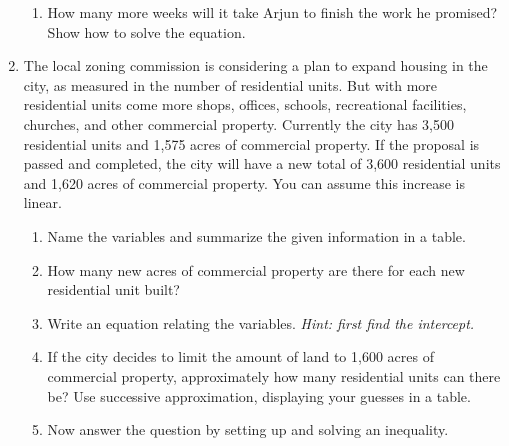 \begin{enumerate}
\begin{enumerate}
\item How many more weeks will it take Arjun to finish the work he promised?  Show how to solve the equation. 
\vfill
\vfill
\end{enumerate} 

\newpage

\item The local zoning commission is considering a plan to expand housing in the city, as measured in the number of residential units.  But with more residential units come more shops, offices, schools, recreational facilities, churches, and other commercial property. Currently the city has 3,500 residential units and 1,575 acres of commercial property.  If the proposal is passed and completed, the city will have a new total of 3,600 residential units and 1,620 acres of commercial property.  You can assume this increase is linear.
\begin{enumerate}
\item Name the variables and summarize the given information in a table. 
\vfill
\item How many new acres of commercial property are there for each new residential unit built? 
\vfill
\item Write an equation relating the variables. \emph{Hint:  first find the intercept.}
\vfill
\vfill
\item If the city decides to limit the amount of land to 1,600 acres of commercial property, approximately how many residential units can there be?  Use successive approximation, displaying your guesses in a table.
\vfill
\item Now answer the question by setting up and solving an inequality. 
\vfill
\end{enumerate} 


\end{enumerate}
